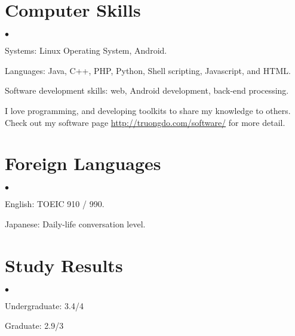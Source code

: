 \documentclass[margin,line]{res}
\newenvironment{list2}{
  \begin{list}{$\bullet$}{%
      \setlength{\itemsep}{0in}
      \setlength{\parsep}{0in} \setlength{\parskip}{0in}
      \setlength{\topsep}{0in} \setlength{\partopsep}{0in}
      \setlength{\leftmargin}{0.2in}}}{\end{list}}
\begin{document}
\begin{resume}
\section{\sc Computer Skills }
\begin{list2}
\item Systems: Linux Operating System, Android.
\item Languages: Java, C++, PHP, Python, Shell scripting, Javascript, and HTML.
\item Software development skills: web, Android development, back-end processing.
\item I love programming, and developing toolkits to share my knowledge to others. Check out my software page \url{http://truongdo.com/software/} for more detail.
\end{list2}
\section{\sc Foreign Languages}
\begin{list2}
\item English: TOEIC 910 / 990.
\item Japanese: Daily-life conversation level.
\end{list2}
\section{\sc Study Results}
\begin{list2}
\item Undergraduate: 3.4/4
\item Graduate: 2.9/3
\end{list2}


\end{resume}
\end{document}
